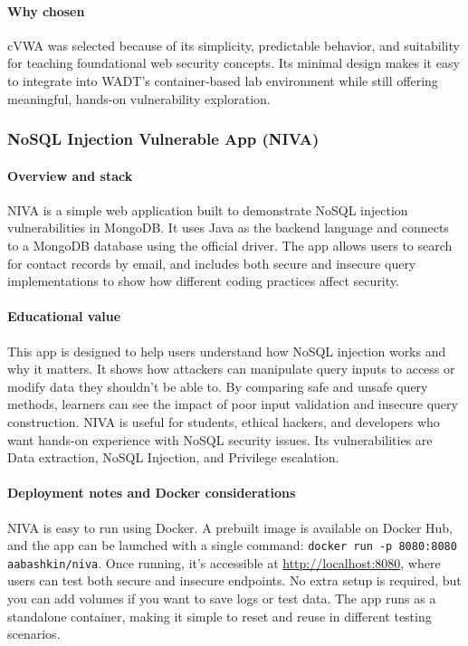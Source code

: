 \documentclass[12pt,titlepage]{article}
\begin{document}
\paragraph{Why chosen}
cVWA was selected because of its simplicity, predictable behavior, and suitability for teaching foundational web security concepts. Its minimal design makes it easy to integrate into WADT’s container-based lab environment while still offering meaningful, hands-on vulnerability exploration.

\subsubsection{NoSQL Injection Vulnerable App (NIVA)}

\paragraph{Overview and stack}
NIVA is a simple web application built to demonstrate NoSQL injection vulnerabilities in MongoDB. It uses Java as the backend language and connects to a MongoDB database using the official driver. The app allows users to search for contact records by email, and includes both secure and insecure query implementations to show how different coding practices affect security.

\paragraph{Educational value}
This app is designed to help users understand how NoSQL injection works and why it matters. It shows how attackers can manipulate query inputs to access or modify data they shouldn’t be able to. By comparing safe and unsafe query methods, learners can see the impact of poor input validation and insecure query construction. NIVA is useful for students, ethical hackers, and developers who want hands-on experience with NoSQL security issues. Its vulnerabilities are Data extraction, NoSQL Injection, and Privilege escalation.

\paragraph{Deployment notes and Docker considerations}
NIVA is easy to run using Docker. A prebuilt image is available on Docker Hub, and the app can be launched with a single command: \texttt{docker run -p 8080:8080 aabashkin/niva}. Once running, it’s accessible at \url{http://localhost:8080}, where users can test both secure and insecure endpoints. No extra setup is required, but you can add volumes if you want to save logs or test data. The app runs as a standalone container, making it simple to reset and reuse in different testing scenarios.
\end{document}
